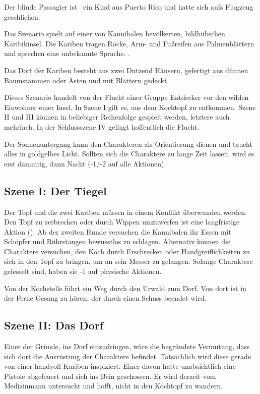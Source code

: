 {		\noindent
		Der blinde Passagier ist \zB~ein Kind aus Puerto Rico und hatte sich aufs Flugzeug geschlichen.


		\noindent
		Das Szenario spielt auf einer von Kannibalen bevölkerten, bildhübschen Karibikinsel. Die Kariben tragen Röcke, Arm- und Fußreifen aus Palmenblättern und sprechen eine unbekannte Sprache. .

		Das Dorf der Kariben besteht aus zwei Dutzend Häusern, gefertigt aus dünnen Baumstämmen oder Ästen und mit Blättern gedeckt.


		\noindent
		Dieses Szenario handelt von der Flucht einer Gruppe Entdecker vor den wilden Einwohner einer Insel. In Szene I gilt es, aus dem Kochtopf zu entkommen. Szene II und III können in beliebiger Reihenfolge gespielt werden, letztere auch mehrfach. In der Schlussszene IV gelingt hoffentlich die Flucht.

		Der Sonnenuntergang kann den Charakteren als Orientierung dienen und taucht alles in goldgelbes Licht. Sollten sich die Charaktere zu lange Zeit lassen, wird es erst dämmrig, dann Nacht (-1/-2 auf alle Aktionen).

		\subsection{Szene I: Der Tiegel}

		Der Topf und die zwei Kariben müssen in einem Konflikt überwunden werden. Den Topf zu zerbrechen oder durch Wippen umzuwerfen ist eine langfristige Aktion (). Ab der zweiten Runde versuchen die Kannibalen ihr Essen mit Schöpfer und Rührstangen bewusstlos zu schlagen. Alternativ können die Charaktere versuchen, den Koch durch Erschrecken oder Handgreiflichkeiten zu sich in den Topf zu bringen, um an sein Messer zu gelangen. Solange Charaktere gefesselt sind, haben sie -1 auf physische Aktionen.

		Von der Kochstelle führt ein Weg durch den Urwald zum Dorf. Von dort ist in der Ferne Gesang zu hören, der durch einen Schuss beendet wird.

		\subsection{Szene II: Das Dorf}

		Einer der Gründe, ins Dorf einzudringen, wäre die begründete Vermutung, dass sich dort die Ausrüstung der Charaktere befindet. Tatsächlich wird diese gerade von einer handvoll Kariben inspiziert. Einer davon hatte unabsichtlich eine Pistole abgefeuert und sich ins Bein geschossen. Er wird derzeit vom Medizinmann untersucht und hofft, nicht in den Kochtopf zu wandern.

}
